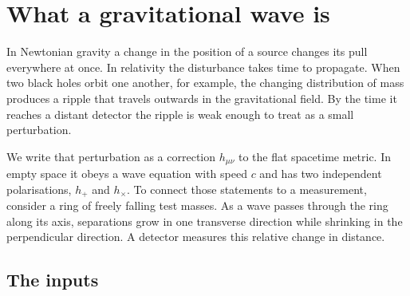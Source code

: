\section{What a gravitational wave is}
\label{T2g:sec:wave}

In Newtonian gravity a change in the position of a source changes its pull everywhere at once. In relativity the disturbance takes time to propagate. When two black holes orbit one another, for example, the changing distribution of mass produces a ripple that travels outwards in the gravitational field. By the time it reaches a distant detector the ripple is weak enough to treat as a small perturbation.

We write that perturbation as a correction $h_{\mu\nu}$ to the flat spacetime metric. In empty space it obeys a wave equation with speed $c$ and has two independent polarisations, $h_+$ and $h_\times$. To connect those statements to a measurement, consider a ring of freely falling test masses. As a wave passes through the ring along its axis, separations grow in one transverse direction while shrinking in the perpendicular direction. A detector measures this relative change in distance.

\subsection{The inputs}

